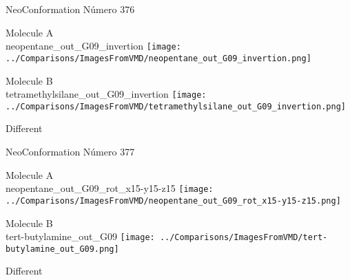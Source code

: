 \vtab[-3cm]
\begin{center}
{\large NeoConformation \tab Número 376}
\end{center}
\begin{multicols}{2}
\begin{center}
Molecule A \\ 
neopentane\_out\_G09\_invertion
\texttt{[image: ../Comparisons/ImagesFromVMD/neopentane\_out\_G09\_invertion.png]}
\\
\vtab

\columnbreak
Molecule B \\ 
tetramethylsilane\_out\_G09\_invertion
\texttt{[image: ../Comparisons/ImagesFromVMD/tetramethylsilane\_out\_G09\_invertion.png]}
\\
\vtab


\end{center}
\end{multicols}
\begin{center}
\textcolor{NavyBlue}{\Large Different}
\end{center}

 \newpage

\vtab[-3cm]
\begin{center}
{\large NeoConformation \tab Número 377}
\end{center}
\begin{multicols}{2}
\begin{center}
Molecule A \\ 
neopentane\_out\_G09\_rot\_x15-y15-z15
\texttt{[image: ../Comparisons/ImagesFromVMD/neopentane\_out\_G09\_rot\_x15-y15-z15.png]}
\\
\vtab

\columnbreak
Molecule B \\ 
tert-butylamine\_out\_G09
\texttt{[image: ../Comparisons/ImagesFromVMD/tert-butylamine\_out\_G09.png]}
\\
\vtab


\end{center}
\end{multicols}
\begin{center}
\textcolor{NavyBlue}{\Large Different}
\end{center}

 \newpage

